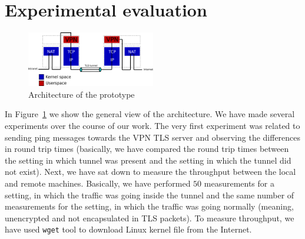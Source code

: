 \section{Experimental evaluation}
\label{section:experiments}



\begin{figure}[!h]
        \includegraphics[width=0.5\textwidth]{graphics/architecture.png}
        \caption{Architecture of the prototype}
        \label{fig:arch}
\end{figure}



In Figure~\ref{fig:arch} we show the general view of the architecture. 
We have made several experiments over the course of our work. The very first experiment was 
related to sending ping messages towards the VPN TLS server and observing the differences in
round trip times (basically, we have compared the round trip times between the setting in 
which tunnel was present and the setting in which the tunnel did not exist). Next, we have
sat down to measure the throughput between the local and remote machines. Basically, we have 
performed $50$ measurements for a setting, in which the traffic was going inside the tunnel
and the same number of measurements for the setting, in which the traffic was going 
normally (meaning, unencrypted and not encapsulated in TLS packets). To measure throughput,
we have used \texttt{wget} tool to download Linux kernel file from the Internet.

